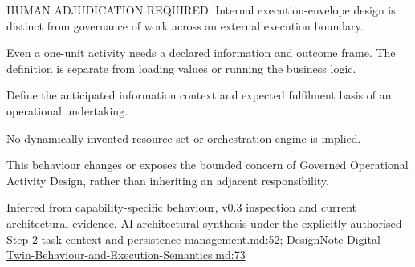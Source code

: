 HUMAN ADJUDICATION REQUIRED: Internal execution-envelope design is distinct from governance of work across an external execution boundary.



Even a one-unit activity needs a declared information and outcome frame. The definition is separate from loading values or running the business logic.



Define the anticipated information context and expected fulfilment basis of an operational undertaking.



No dynamically invented resource set or orchestration engine is implied.



This behaviour changes or exposes the bounded concern of Governed Operational Activity Design, rather than inheriting an adjacent responsibility.


Inferred from capability-specific behaviour, v0.3 inspection and current architectural evidence. AI architectural synthesis under the explicitly authorised Step 2 task \hyperref[evidence:ea0c62dfd5edfd4a]{context-and-persistence-management.md:52}; \hyperref[evidence:ec6250f7cf7c29a5]{DesignNote-Digital-Twin-Behaviour-and-Execution-Semantics.md:73}
